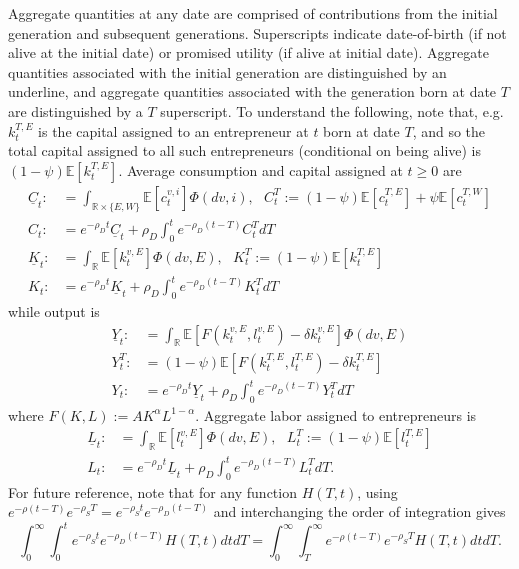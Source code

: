 \documentclass[11pt]{article}
\theoremstyle{plain}
\theoremstyle{definition} %
\begin{document}
Aggregate quantities at any date are comprised of contributions from the initial generation and subsequent generations. Superscripts indicate date-of-birth (if not alive at the initial date) or promised utility (if alive at initial date). Aggregate quantities associated with the initial generation are distinguished by an underline, and aggregate quantities associated with the generation born at date $T$ are distinguished by a $T$ superscript. To understand the following, note that, e.g. $k^{T,E}_t$ is the capital assigned to an entrepreneur at $t$ born at date $T$, and so the total capital assigned to all such entrepreneurs (conditional on being alive) is $(1-\psi)\mathbb{E}[k^{T,E}_t]$. Average consumption and capital assigned at $t\geq0$ are 
\begin{align*} 
\underline{C}_t : & = \int_{\mathbb{R} \times \{E,W\}}\mathbb{E}[c^{v,i}_t]\Phi(dv, i), 
\ \ \ C^T_t := (1-\psi)\mathbb{E}[c^{T,E}_t] + \psi \mathbb{E}[c^{T,W}_t]
\\ C_t : & = e^{- \rho_D t}\underline{C}_t  + \rho_D\int_{0}^{t}e^{-\rho_D (t-T)} C^T_tdT
\\ \underline{K}_t : & = \int_{\mathbb{R}}\mathbb{E}[k^{v,E}_t]\Phi(dv, E), 
\ \ \ K^T_t := (1-\psi)\mathbb{E}[k^{T,E}_t]
\\ K_t : & = e^{- \rho_D t}\underline{K}_t + \rho_D\int_{0}^te^{-\rho_D (t-T)} K^T_tdT
\end{align*}
while output is 
\begin{align*}
\underline{Y}_t : & = \int_{\mathbb{R}}\mathbb{E}[F(k^{v,E}_t, l^{v,E}_t) - \delta k^{v,E}_t]\Phi(dv, E) 
\\ Y^T_t : & = (1 - \psi) \mathbb{E}[F(k^{T,E}_t, l^{T,E}_t) - \delta k^{T,E}_t]
\\ Y_t : & = e^{-\rho_D t}\underline{Y}_t + \rho_D\int_0^te^{-\rho_D (t-T)} Y^T_tdT 
\end{align*}
where $F(K,L) := AK^{\alpha}L^{1-\alpha}$. Aggregate labor assigned to entrepreneurs is
\begin{align*}
\underline{L}_t : & = \int_{\mathbb{R}}\mathbb{E}[l^{v,E}_t]\Phi(dv, E), \ \ \ L^T_t := (1-\psi) \mathbb{E}[l^{T,E}_t]
\\ L_t : & = e^{- \rho_D t}\underline{L}_t  +  \rho_D\int_0^te^{-\rho_D (t-T)} L^T_tdT.
\end{align*}
For future reference, note that for any function $H(T,t)$, using $e^{-\rho (t-T)}e^{-\rho_S T} = e^{-\rho_S t} e^{-\rho_D (t-T)}$ and interchanging the order of integration gives
\begin{equation}
\int_0^{\infty}\int_0^t  e^{-\rho_S t} e^{-\rho_D (t-T)}H(T,t)dtdT = \int_0^{\infty}\int_T^{\infty} e^{-\rho (t-T)}e^{-\rho_S T}H(T,t)dtdT.
\label{intint}
\end{equation}
\end{document}
